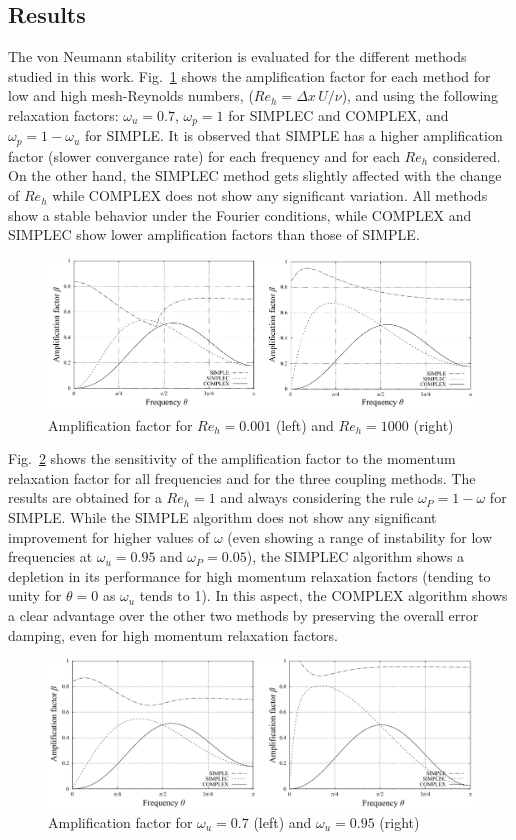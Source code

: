 \documentclass[final,3p,times,11pt,onecolumn]{myElsarticle}
\numberwithin{equation}{section}
\begin{document}
\subsection{Results}
The von Neumann stability criterion is evaluated for the different methods studied in this work. Fig.~\ref{fig:1a} shows the amplification factor for each method for low and high mesh-Reynolds numbers, ($Re_h = \Delta x\, U/\nu$), and using the following relaxation factors: $\omega_u=0.7$, $\omega_p = 1$ for SIMPLEC and COMPLEX, and $\omega_p=1-\omega_u$ for SIMPLE.  It is observed that SIMPLE has a higher amplification factor (slower convergance rate) for each frequency and for each $Re_h$ considered. On the other hand, the SIMPLEC method gets slightly affected with the change of $Re_h$ while COMPLEX does not show any significant variation. All methods show a stable behavior under the Fourier conditions, while COMPLEX and SIMPLEC show lower amplification factors than those of SIMPLE.
\begin{figure}[t!!]
    \centering
    \includegraphics[width=\textwidth]{fig/Re_fourier.pdf}
    \caption{Amplification factor for $Re_h=0.001$ (left) and $Re_h=1000$ (right)}
    \label{fig:1a}
\end{figure}
Fig.~\ref{fig:1b} shows the sensitivity of the amplification factor to the momentum relaxation factor for all frequencies and for the three coupling methods. The results are obtained for a $Re_h=1$ and always considering the rule $\omega_P = 1 - \omega$ for SIMPLE. While the SIMPLE algorithm does not show any significant improvement for higher values of $\omega$ (even showing a range of instability for low frequencies at $\omega_u=0.95$ and $\omega_P=0.05$), the SIMPLEC algorithm shows a depletion in its performance for high momentum relaxation factors (tending to unity for $\theta=0$ as $\omega_u$ tends to 1). In this aspect, the COMPLEX algorithm shows a clear advantage over the other two methods by preserving the overall error damping, even for high momentum relaxation factors.     
\begin{figure}[t!!]
    \centering
    \includegraphics[width=\textwidth]{fig/w_fourier.pdf}
    \caption{Amplification factor for $\omega_u=0.7$ (left) and $\omega_u=0.95$ (right)}
    \label{fig:1b}
\end{figure}    
\end{document}
